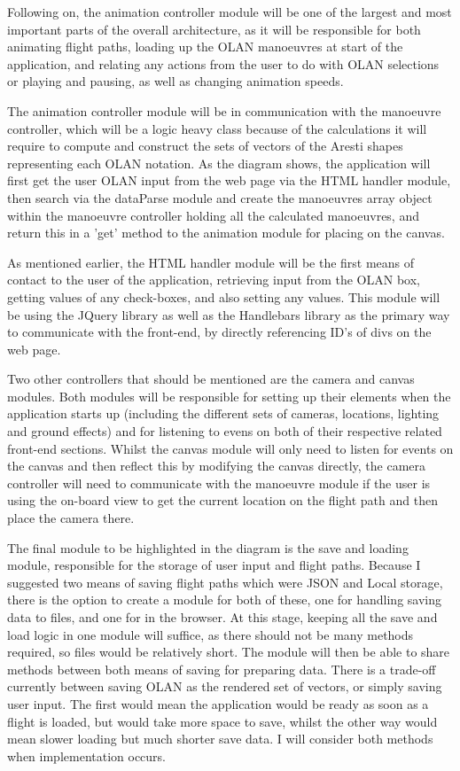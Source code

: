 Following on, the animation controller module will be one of the largest and most important parts of the overall architecture, as it will be responsible for both animating flight paths, loading up the OLAN manoeuvres at start of the application, and relating any actions from the user to do with OLAN selections or playing and pausing, as well as changing animation speeds. 

The animation controller module will be in communication with the manoeuvre controller, which will be a logic heavy class because of the calculations it will require to compute and construct the sets of vectors of the Aresti shapes representing each OLAN notation. As the diagram shows, the application will first get the user OLAN input from the web page via the HTML handler module, then search via the dataParse module and create the manoeuvres array object within the manoeuvre controller holding all the calculated manoeuvres, and return this in a 'get' method to the animation module for placing on the canvas.

As mentioned earlier, the HTML handler module will be the first means of contact to the user of the application, retrieving input from the OLAN box, getting values of any check-boxes, and also setting any values. This module will be using the JQuery library as well as the Handlebars library as the primary way to communicate with the front-end, by directly referencing ID's of divs on the web page.

Two other controllers that should be mentioned are the camera and canvas modules. Both modules will be responsible for setting up their elements when the application starts up (including the different sets of cameras, locations, lighting and ground effects) and for listening to evens on both of their respective related front-end sections. Whilst the canvas module will only need to listen for events on the canvas and then reflect this by modifying the canvas directly, the camera controller will need to communicate with the manoeuvre module if the user is using the on-board view to get the current location on the flight path and then place the camera there. 

The final module to be highlighted in the diagram is the save and loading module, responsible for the storage of user input and flight paths. Because I suggested two means of saving flight paths which were JSON and Local storage, there is the option to create a module for both of these, one for handling saving data to files, and one for in the browser. At this stage, keeping all the save and load logic in one module will suffice, as there should not be many methods required, so files would be relatively short. The module will then be able to share methods between both means of saving for preparing data. There is a trade-off currently between saving OLAN as the rendered set of vectors, or simply saving user input. The first would mean the application would be ready as soon as a flight is loaded, but would take more space to save, whilst the other way would mean slower loading but much shorter save data. I will consider both methods when implementation occurs.

